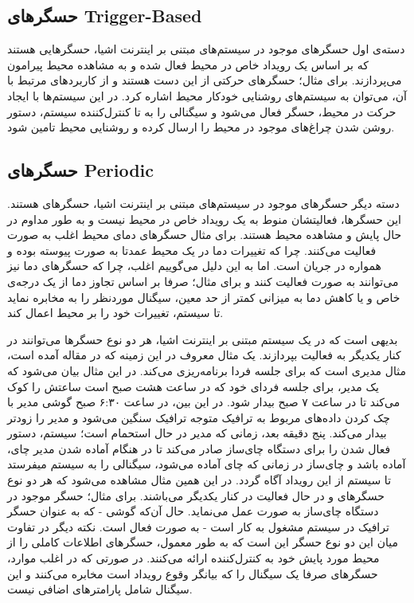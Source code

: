 \subsection{حسگرهای Trigger-Based}
دسته‌ی اول حسگرهای موجود در سیستم‌های مبتنی بر اینترنت اشیا، حسگرهایی هستند که بر اساس یک رویداد خاص در محیط فعال شده و به مشاهده محیط پیرامون می‌پردازند. برای مثال؛ حسگرهای حرکتی از این دست هستند و از کاربردهای مرتبط با آن‌، می‌توان به سیستم‌های روشنایی خودکار محیط اشاره کرد. در این سیستم‌ها با ایجاد حرکت در محیط، حسگر فعال می‌شود و سیگنالی را به  تا کنترل‌کننده سیستم، دستور روشن شدن چراغ‌های موجود در محیط را ارسال کرده و روشنایی محیط تامین شود.

\subsection{حسگر‌های Periodic}
دسته دیگر حسگرهای موجود در سیستم‌های مبتنی بر اینترنت اشیا، حسگر‌های  هستند. این حسگرها، فعالیتشان منوط به یک رویداد خاص در محیط نیست و به طور مداوم در حال پایش و مشاهده محیط هستند. برای مثال حسگرهای دمای محیط اغلب به صورت  فعالیت می‌کنند. چرا که تغییرات دما در یک محیط عمدتا به صورت پیوسته بوده و همواره در جریان است. اما به این دلیل می‌گوییم اغلب، چرا که حسگر‌های دما نیز می‌توانند به صورت  فعالیت کنند و برای مثال؛ صرفا بر اساس تجاوز دما از یک درجه‌ی خاص و یا کاهش دما به میزانی کمتر از حد معین، سیگنال موردنظر را به  مخابره نماید تا سیستم، تغییرات خود را بر محیط اعمال کند.

\par
بدیهی است که در یک سیستم مبتنی بر اینترنت اشیا، هر دو نوع حسگرها می‌توانند در کنار یکدیگر به فعالیت بپردازند. یک مثال معروف در این زمینه که در مقاله \cite{} آمده است، مثال مدیری است که برای جلسه فردا برنامه‌ریزی می‌کند. در این مثال بیان می‌شود که یک مدیر، برای جلسه فردای خود که در ساعت هشت صبح است ساعتش را کوک می‌کند تا در ساعت ۷ صبح بیدار شود. در این بین، در ساعت ۶:۳۰ صبح گوشی مدیر با چک کردن داده‌های مربوط به ترافیک متوجه ترافیک سنگین می‌شود و مدیر را زودتر بیدار می‌کند. پنج دقیقه بعد، زمانی که مدیر در حال استحمام است؛ سیستم، دستور فعال شدن را برای دستگاه چای‌ساز صادر می‌کند تا در هنگام آماده شدن مدیر چای، آماده باشد و چای‌ساز در زمانی که چای آماده می‌شود، سیگنالی را به سیستم میفرستد تا سیستم از این رویداد آگاه گردد. در این همین مثال مشاهده می‌شود که هر دو نوع حسگرهای  و  در حال فعالیت در کنار یکدیگر می‌باشند. برای مثال؛ حسگر موجود در دستگاه چای‌ساز به صورت  عمل می‌نماید. حال آن‌که گوشی - که به عنوان حسگر ترافیک در سیستم مشغول به کار است - به صورت  فعال است. نکته دیگر در تفاوت میان این دو نوع حسگر این است که به طور معمول، حسگرهای  اطلاعات کاملی را از محیط مورد پایش خود به کنترل‌کننده ارائه می‌کنند. در صورتی که در اغلب موارد، حسگرهای  صرفا یک سیگنال را که بیانگر وقوع رویداد است مخابره می‌کنند و این سیگنال شامل پارامترهای اضافی نیست.

